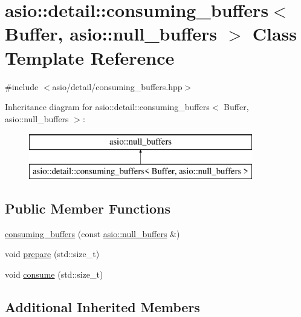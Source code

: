 \hypertarget{classasio_1_1detail_1_1consuming__buffers_3_01_buffer_00_01asio_1_1null__buffers_01_4}{}\section{asio\+:\+:detail\+:\+:consuming\+\_\+buffers$<$ Buffer, asio\+:\+:null\+\_\+buffers $>$ Class Template Reference}
\label{classasio_1_1detail_1_1consuming__buffers_3_01_buffer_00_01asio_1_1null__buffers_01_4}


{\ttfamily \#include $<$asio/detail/consuming\+\_\+buffers.\+hpp$>$}

Inheritance diagram for asio\+:\+:detail\+:\+:consuming\+\_\+buffers$<$ Buffer, asio\+:\+:null\+\_\+buffers $>$\+:\begin{figure}[H]
\begin{center}
\leavevmode
\includegraphics[height=2.000000cm]{classasio_1_1detail_1_1consuming__buffers_3_01_buffer_00_01asio_1_1null__buffers_01_4}
\end{center}
\end{figure}
\subsection*{Public Member Functions}
\begin{DoxyCompactItemize}
\item 
\hyperlink{classasio_1_1detail_1_1consuming__buffers_3_01_buffer_00_01asio_1_1null__buffers_01_4_aa51cc2fe38c0bdaa4fcc640db277df3a}{consuming\+\_\+buffers} (const \hyperlink{classasio_1_1null__buffers}{asio\+::null\+\_\+buffers} \&)
\item 
void \hyperlink{classasio_1_1detail_1_1consuming__buffers_3_01_buffer_00_01asio_1_1null__buffers_01_4_a1fa39060b25393602ffb0b1fe87d994b}{prepare} (std\+::size\+\_\+t)
\item 
void \hyperlink{classasio_1_1detail_1_1consuming__buffers_3_01_buffer_00_01asio_1_1null__buffers_01_4_af386224bbfde42eec769e4b045795110}{consume} (std\+::size\+\_\+t)
\end{DoxyCompactItemize}
\subsection*{Additional Inherited Members}


